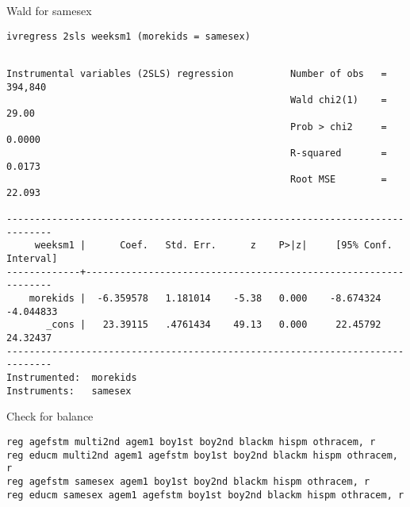 \documentclass[11pt]{article}
\begin{document}
Wald for samesex
\begin{verbatim}
ivregress 2sls weeksm1 (morekids = samesex)
\end{verbatim}

\begin{verbatim}

Instrumental variables (2SLS) regression          Number of obs   =    394,840
                                                  Wald chi2(1)    =      29.00
                                                  Prob > chi2     =     0.0000
                                                  R-squared       =     0.0173
                                                  Root MSE        =     22.093

------------------------------------------------------------------------------
     weeksm1 |      Coef.   Std. Err.      z    P>|z|     [95% Conf. Interval]
-------------+----------------------------------------------------------------
    morekids |  -6.359578   1.181014    -5.38   0.000    -8.674324   -4.044833
       _cons |   23.39115   .4761434    49.13   0.000     22.45792    24.32437
------------------------------------------------------------------------------
Instrumented:  morekids
Instruments:   samesex
\end{verbatim}

Check for balance
\begin{verbatim}
reg agefstm multi2nd agem1 boy1st boy2nd blackm hispm othracem, r
reg educm multi2nd agem1 agefstm boy1st boy2nd blackm hispm othracem, r
reg agefstm samesex agem1 boy1st boy2nd blackm hispm othracem, r
reg educm samesex agem1 agefstm boy1st boy2nd blackm hispm othracem, r
\end{verbatim}
\end{document}
